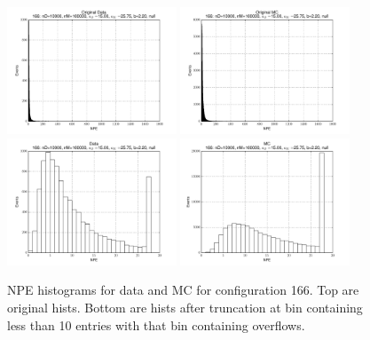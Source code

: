  \begin{figure}[htbp] \begin{center} 
\includegraphics[width=0.45\textwidth]{../FIGURES/166/FIG_Original_Data.pdf} 
\includegraphics[width=0.45\textwidth]{../FIGURES/166/FIG_Original_MC.pdf} 
\includegraphics[width=0.45\textwidth]{../FIGURES/166/FIG_Data.pdf} 
\includegraphics[width=0.45\textwidth]{../FIGURES/166/FIG_MC.pdf} 
\caption{NPE histograms for data and MC for configuration 166. Top are original hists. Bottom are hists after truncation at bin containing less than 10 entries with that bin containing overflows.} 
\label{tab:npe_166} 
\end{center} \end{figure} 
\clearpage
 